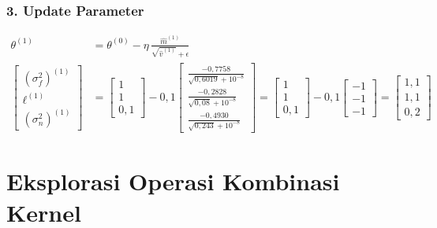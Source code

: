 \documentclass[11pt,a4paper]{article}
\def\boldsymbol#1{#1}%
\def\mathbf#1{#1}%
\begin{document}
\subsubsection*{3. Update Parameter}
\begin{align}
\boldsymbol{\theta}^{(1)} &= \boldsymbol{\theta}^{(0)} - \eta \, \frac{\hat{\mathbf{m}}^{(1)}}{\sqrt{\hat{\mathbf{v}}^{(1)}} + \epsilon} \nonumber \\
\begin{bmatrix} (\sigma_f^2)^{(1)} \\[0.4em] \ell^{(1)} \\[0.4em] (\sigma_n^2)^{(1)} \end{bmatrix} &= \begin{bmatrix} 1 \\ 1 \\ 0{,}1 \end{bmatrix} - 0{,}1 \begin{bmatrix} \frac{-0{,}7758}{\sqrt{0{,}6019} + 10^{-8}} \\[0.4em] \frac{-0{,}2828}{\sqrt{0{,}08} + 10^{-8}} \\[0.4em] \frac{-0{,}4930}{\sqrt{0{,}243} + 10^{-8}} \end{bmatrix} = \begin{bmatrix} 1 \\ 1 \\ 0{,}1 \end{bmatrix} - 0{,}1 \begin{bmatrix} -1 \\ -1 \\ -1 \end{bmatrix} = \begin{bmatrix} 1{,}1 \\ 1{,}1 \\ 0{,}2 \end{bmatrix}
\end{align}




\section{Eksplorasi Operasi Kombinasi Kernel}
\label{sec:operasi_kernel}
\end{document}
